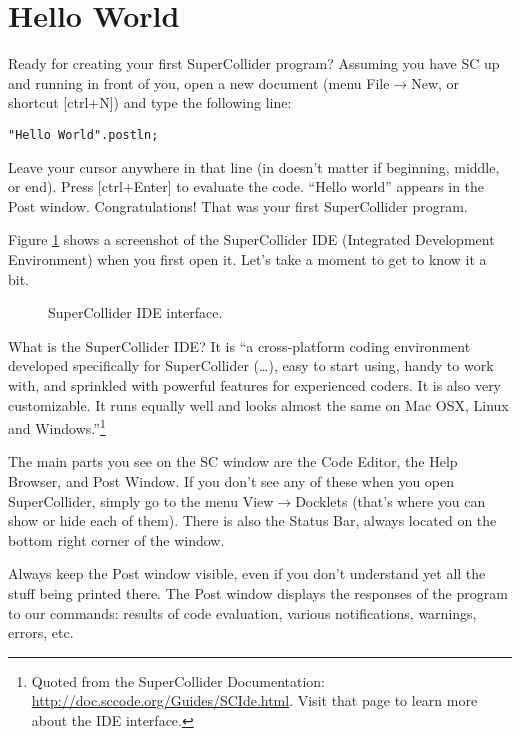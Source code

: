 \section{Hello World}

Ready for creating your first SuperCollider program? Assuming you have SC up and running in front of you, open a new document (menu File$\rightarrow$New, or shortcut [ctrl+N]) and type the following line:

 
\begin{lstlisting}[style=SuperCollider-IDE, basicstyle=\scttfamily\footnotesize ]
"Hello World".postln;
\end{lstlisting}
 

Leave your cursor anywhere in that line (in doesn't matter if beginning, middle, or end). Press [ctrl+Enter] to evaluate the code. ``Hello world'' appears in the Post window. Congratulations! That was your first SuperCollider program.

 
\bigskip
{}
\bigskip
 

Figure \ref{fig:scidegui} shows a screenshot of the SuperCollider IDE (Integrated Development Environment) when you first open it. Let's take a moment to get to know it a bit.

\begin{figure}[t]
\centerline{}
\caption{SuperCollider IDE interface.}
\label{fig:scidegui}
\end{figure}

What is the SuperCollider IDE? It is ``a cross-platform coding environment developed specifically for SuperCollider (\dots), easy to start using, handy to work with, and sprinkled with powerful features for experienced coders. It is also very customizable. It runs equally well and looks almost the same on Mac OSX, Linux and Windows.''\footnote{Quoted from the SuperCollider Documentation: \url{http://doc.sccode.org/Guides/SCIde.html}. Visit that page to learn more about the IDE interface.}

The main parts you see on the SC window are the Code Editor, the Help Browser, and Post Window. If you don't see any of these when you open SuperCollider, simply go to the menu View$\rightarrow$Docklets (that's where you can show or hide each of them). There is also the Status Bar, always located on the bottom right corner of the window.

Always keep the Post window visible, even if you don't understand yet all the stuff being printed there. The Post window displays the responses of the program to our commands: results of code evaluation, various notifications, warnings, errors, etc.

\bigskip
{}
\bigskip


